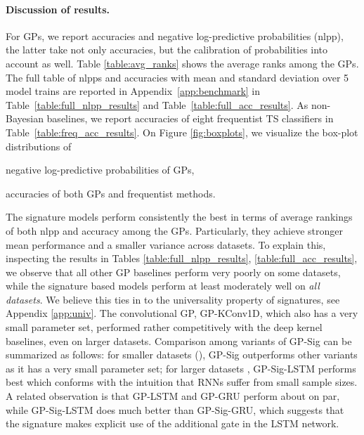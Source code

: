 \documentclass{article}
\begin{document}
\paragraph{Discussion of results.}
For GPs, we report accuracies and negative log-predictive probabilities (nlpp), the latter take not only accuracies, but the calibration of probabilities into account as well.
Table \ref{table:avg_ranks} shows the average ranks among the GPs.
The full table of nlpps and accuracies with mean and standard deviation over 5 model trains are reported in Appendix~\ref{app:benchmark} in Table~\ref{table:full_nlpp_results} and Table~\ref{table:full_acc_results}.
As non-Bayesian baselines, we report accuracies of eight frequentist TS classifiers in Table~\ref{table:freq_acc_results}. On Figure \ref{fig:boxplots}, we visualize the box-plot distributions of \begin{enumerate*}[label=(\roman*)] \item negative log-predictive probabilities of GPs, \item accuracies of both GPs and frequentist methods. \end{enumerate*}

The signature models perform consistently the best in terms of average rankings of both nlpp and accuracy among the GPs. Particularly, they achieve stronger mean performance and a smaller variance across datasets. To explain this, inspecting the results in Tables \ref{table:full_nlpp_results}, \ref{table:full_acc_results}, we observe that all other GP baselines perform very poorly on some datasets, while the signature based models perform at least moderately well on \emph{all datasets}. We believe this ties in to the universality property of signatures, see Appendix \ref{app:univ}. The convolutional GP, GP-KConv1D, which also has a very small parameter set, performed rather competitively with the deep kernel baselines, even on larger datasets. Comparison among variants of GP-Sig can be summarized as follows: for smaller datasets (), GP-Sig outperforms other variants as it has a very small parameter set; for larger datasets , GP-Sig-LSTM performs best which conforms with the intuition that RNNs suffer from small sample sizes.
A related observation is that GP-LSTM and GP-GRU perform about on par, while GP-Sig-LSTM does much better than GP-Sig-GRU, which suggests that the signature makes explicit use of the additional gate in the LSTM network.
\end{document}
